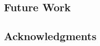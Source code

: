 \documentclass[acmtoms]{doc_acmtrans2m}
\begin{document}
 
\subsection{Future Work}


\frenchspacing




\vfill
\subsection*{Acknowledgments}
 

\bigskip \bigskip \bigskip

{\small }
\end{document}
